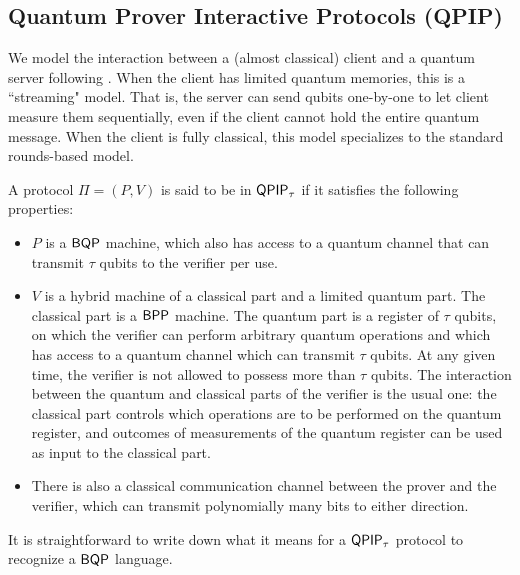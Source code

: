 \subsection{Quantum Prover Interactive Protocols (QPIP)}

We model the interaction between a (almost classical) client and a quantum server following \cite{FOCS:Mahadev18a}.
When the client has limited quantum memories, this is a ``streaming" model.
That is, the server can send qubits one-by-one to let client measure them sequentially,
even if the client cannot hold the entire quantum message.
When the client is fully classical,
this model specializes to the standard rounds-based model.

\begin{definition}
    A protocol $\Pi=(P, V)$ is said to be in $\operatorname{\mathsf{QPIP}}_\tau$ if it satisfies the following properties:
    \begin{itemize}
        \item $P$ is a $\operatorname{\mathsf{BQP}}$ machine, which also has access to a quantum channel that can transmit $\tau$ qubits to the verifier per use.
        \item $V$ is a hybrid machine of a classical part and a limited quantum part. The classical part is a $\operatorname{\mathsf{BPP}}$ machine. The quantum part is a register of $\tau$ qubits, on which the verifier can perform arbitrary quantum operations and which has access to a quantum channel which can transmit $\tau$ qubits. At any given time, the verifier is not allowed to possess more than $\tau$ qubits. The interaction between the quantum and classical parts of the verifier is the usual one: the classical part controls which operations are to be performed on the quantum register, and outcomes of measurements of the quantum register can be used as input to the classical part.
        \item There is also a classical communication channel between the prover and the verifier, which can transmit polynomially many bits to either direction.
    \end{itemize}
\end{definition}

It is straightforward to write down what it means for a $\operatorname{\mathsf{QPIP}}_\tau$ protocol to recognize a $\operatorname{\mathsf{BQP}}$ language.

